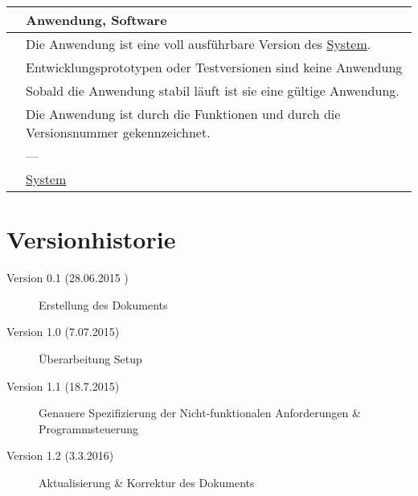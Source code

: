 \begin{center}
	\hypertarget{tab:anwendung}{}
	\begin{tabular}{| p{4cm} | p{11cm} |}
		\hline
		\term & Anwendung, Software \\ \hline
		
		\intent & Die Anwendung ist eine voll ausführbare Version des \hyperlink{tab:system}{System}. \\ \hline
		
		\bound & Entwicklungsprototypen oder Testversionen sind keine Anwendung \\ \hline
		
		\validity & Sobald die Anwendung stabil läuft ist sie eine gültige Anwendung. \\ \hline
		
		\identifier & Die Anwendung ist durch die Funktionen und durch die Versionsnummer gekennzeichnet. \\ \hline
		
		\blur & --- \\ \hline
		
		\crossref & \hyperlink{tab:system}{System} \\
		\hline
	\end{tabular}
	\label{tab:anwendung}
\end{center}

\section{Versionhistorie}
\label{chap:spezi_version}

\begin{description}
	\item [Version 0.1 (28.06.2015 )] Erstellung des Dokuments
	\item [Version 1.0 (7.07.2015)] Überarbeitung Setup
	\item [Version 1.1 (18.7.2015)] Genauere Spezifizierung der Nicht-funktionalen Anforderungen \& Programmsteuerung
	\item [Version 1.2 (3.3.2016)] Aktualisierung \& Korrektur des Dokuments
\end{description}